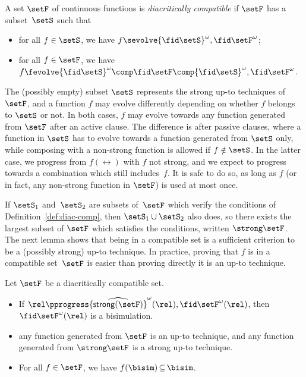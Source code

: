 \documentclass{lmcs}
\theoremstyle{defC}
\begin{document}
\begin{defi}%
  \label{def:diac-comp}
  A set $\setF$ of continuous functions is \emph{diacritically compatible} if
  $\setF$ has a subset~$\setS$ such that
  \begin{itemize}
  \item for all $f \in \setS$, we have $f \sevolve {\fid\setS}^\omega,
    {\fid\setF}^\omega$;
  \item for all $f \in \setF$, we have $f \fevolve {\fid\setS}^\omega \comp
    \fid\setF \comp {\fid\setS}^\omega, {\fid\setF}^\omega$.
  \end{itemize}
\end{defi}

\noindent
The (possibly empty) subset $\setS$ represents the strong up-to techniques of
$\setF$, and a function $f$ may evolve differently depending on whether $f$
belongs to $\setS$ or not. In both cases, $f$ may evolve towards any function
generated from $\setF$ after an active clause. The difference is after passive
clauses, where a function in $\setS$ has to evolve towards a function generated
from $\setS$ only, while composing with a non-strong function is allowed if
$f \notin \setS$. In the latter case, we progress from $f(\rel)$ with $f$ not
strong, and we expect to progress towards a combination which still
includes~$f$. It is safe to do so, as long as $f$ (or in fact, any non-strong
function in $\setF$) is used at most once.

If $\setS_1$ and~$\setS_2$ are subsets of~$\setF$ which verify the conditions of
Definition~\ref{def:diac-comp}, then $\setS_1 \cup \setS_2$ also does, so there
exists the largest subset of $\setF$ which satisfies the conditions, written
$\strong \setF$. The next lemma shows that being in a compatible set is a
sufficient criterion to be a (possibly strong) up-to technique. In practice,
proving that $f$ is in a compatible set~$\setF$ is easier than proving directly
it is an up-to technique.

\begin{lem}%
  \label{l:properties-compatibility-better}
  Let $\setF$ be a diacritically compatible set.
  \begin{itemize}
  \item If
    $\rel \pprogress {\widehat{\mathsf{strong}(\setF)}}^\omega(\rel),
    {\fid\setF}^\omega(\rel)$, then ${\fid\setF}^\omega(\rel)$ is a
    bisimulation.
  \item any function generated from $\setF$ is an up-to technique, and any
    function generated from $\strong\setF$ is a strong up-to technique.
  \item For all $f \in \setF$, we have $f(\bisim) \mathop\subseteq \bisim$.
  \end{itemize}
\end{lem}
\end{document}
